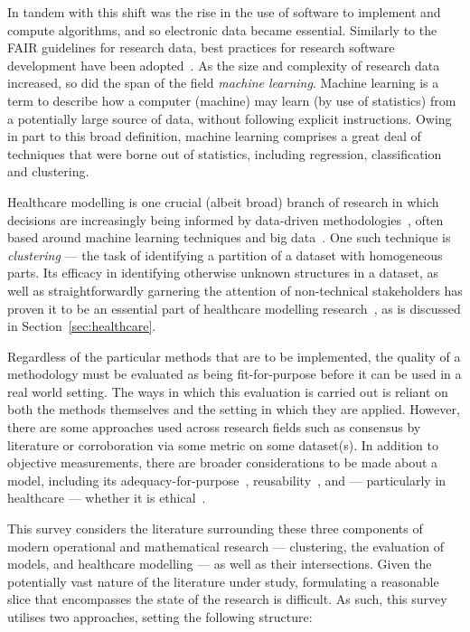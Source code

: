 In tandem with this shift was the rise in the use of software to implement and
compute algorithms, and so electronic data became essential. Similarly to the
FAIR guidelines for research data, best practices for research software
development have been adopted~\cite{Aberdour2007,Benureau2018,Jimenez2017}. As
the size and complexity of research data increased, so did the span of the field
\emph{machine learning}. Machine learning is a term to describe how a computer
(machine) may learn (by use of statistics) from a potentially large source of
data, without following explicit instructions. Owing in part to this broad
definition, machine learning comprises a great deal of techniques that were
borne out of statistics, including regression, classification and clustering.

Healthcare modelling is one crucial (albeit broad) branch of research in which
decisions are increasingly being informed by data-driven
methodologies~\cite{Belle2015,Katsaliaki2011,RiosZertuche2020}, often based
around machine learning techniques and big
data~\cite{Alexander2018,Archenaa2015}. One such technique is \emph{clustering}
--- the task of identifying a partition of a dataset with homogeneous parts. Its
efficacy in identifying otherwise unknown structures in a dataset, as well as
straightforwardly garnering the attention of non-technical stakeholders has
proven it to be an essential part of healthcare modelling
research~\cite{Tomar2013,Yoo2011}, as is discussed in
Section~\ref{sec:healthcare}.

Regardless of the particular methods that are to be implemented, the quality of
a methodology must be evaluated as being fit-for-purpose before it can be used
in a real world setting. The ways in which this evaluation is carried out is
reliant on both the methods themselves and the setting in which they are
applied. However, there are some approaches used across research fields such as
consensus by literature or corroboration via some metric on some dataset(s). In
addition to objective measurements, there are broader considerations to be made
about a model, including its adequacy-for-purpose~\cite{Parker2020},
reusability~\cite{Robinson2004}, and --- particularly in healthcare --- whether
it is ethical~\cite{Grote2020}.

This survey considers the literature surrounding these three components of
modern operational and mathematical research --- clustering, the evaluation of
models, and healthcare modelling --- as well as their intersections. Given the
potentially vast nature of the literature under study, formulating a reasonable
slice that encompasses the state of the research is difficult. As such, this
survey utilises two approaches, setting the following structure:

